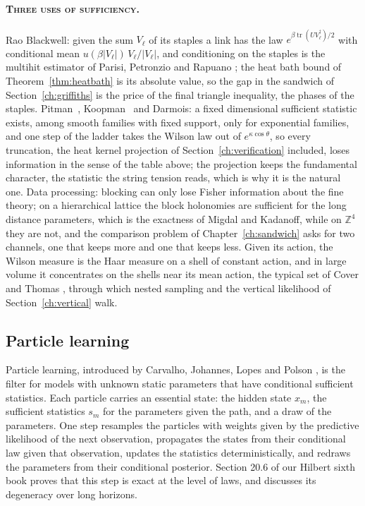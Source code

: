 \paragraph{\normalfont\scshape Three uses of sufficiency.} Rao Blackwell: given the sum $V_\ell$ of its staples a link has the law $e^{\beta\operatorname{tr}(UV_\ell^\dagger)/2}$ with conditional mean $u(\beta|V_\ell|)\,V_\ell/|V_\ell|$, and conditioning on the staples is the multihit estimator of Parisi, Petronzio and Rapuano \cite{PPR}; the heat bath bound of Theorem~\ref{thm:heatbath} is its absolute value, so the gap in the sandwich of Section~\ref{ch:griffiths} is the price of the final triangle inequality, the phases of the staples. Pitman~\cite{Pi36}, Koopman~\cite{Ko36} and Darmois: a fixed dimensional sufficient statistic exists, among smooth families with fixed support, only for exponential families, and one step of the ladder takes the Wilson law out of $e^{\kappa\cos\theta}$, so every truncation, the heat kernel projection of Section~\ref{ch:verification} included, loses information in the sense of the table above; the projection keeps the fundamental character, the statistic the string tension reads, which is why it is the natural one. Data processing: blocking can only lose Fisher information about the fine theory; on a hierarchical lattice the block holonomies are sufficient for the long distance parameters, which is the exactness of Migdal and Kadanoff, while on $\mathbb Z^4$ they are not, and the comparison problem of Chapter~\ref{ch:sandwich} asks for two channels, one that keeps more and one that keeps less. Given its action, the Wilson measure is the Haar measure on a shell of constant action, and in large volume it concentrates on the shells near its mean action, the typical set of Cover and Thomas \cite{CT06}, through which nested sampling and the vertical likelihood of Section~\ref{ch:vertical} walk.

\subsection{Particle learning}

Particle learning, introduced by Carvalho, Johannes, Lopes and Polson \cite{CJLP}, is the filter for models with unknown static parameters that have conditional sufficient statistics. Each particle carries an essential state: the hidden state $x_m$, the sufficient statistics $s_m$ for the parameters given the path, and a draw of the parameters. One step resamples the particles with weights given by the predictive likelihood of the next observation, propagates the states from their conditional law given that observation, updates the statistics deterministically, and redraws the parameters from their conditional posterior. Section 20.6 of our Hilbert sixth book \cite{PS26h} proves that this step is exact at the level of laws, and discusses its degeneracy over long horizons.

